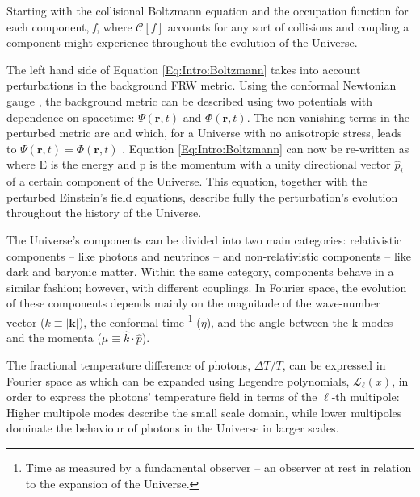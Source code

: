 \qquad Starting with the collisional Boltzmann equation and the occupation function for each component, \textit{f}, 
where $\mathcal{C}[f]$ accounts for any sort of collisions and coupling a component might experience throughout the evolution of the Universe.

\qquad The left hand side of Equation \eqref{Eq:Intro:Boltzmann} takes into account perturbations in the background FRW metric. Using the conformal Newtonian gauge \citep{dods}, the background metric can be described using two potentials with dependence on spacetime: $\Psi (\textbf{r}, t)$ and $\Phi (\textbf{r}, t)$. The non-vanishing terms in the perturbed metric are
and 
which, for a Universe with no anisotropic stress, leads to $\Psi (\textbf{r},t) = \Phi(\textbf{r},t)$ \citep{Peacock}. Equation \eqref{Eq:Intro:Boltzmann} can now be re-written as
where E is the energy and p is the momentum with a unity directional vector $\hat{p}_i$ of a certain component of the Universe. This equation, together with the perturbed Einstein's field equations, describe fully the perturbation's evolution throughout the history of the Universe.

\qquad The Universe's components can be divided into two main categories: relativistic components -- like photons and neutrinos -- and non-relativistic components -- like dark and baryonic matter. Within the same category, components behave in a similar fashion; however, with different couplings. In Fourier space, the evolution of these components depends mainly on the magnitude of the wave-number vector ($k \equiv |\textbf{k}|$), the conformal time \footnote{Time as measured by a fundamental observer -- an observer at rest in relation to the expansion of the Universe.} ($\eta$), and the angle between the k-modes and the momenta ($\mu\equiv \hat{k} \cdot \hat{p}$). 

\qquad The fractional temperature difference of photons, $\Delta T/T$, can be expressed in Fourier space as
which can be expanded using Legendre polynomials, $\mathcal{L}_{\ell}(x)$, in order to express the photons' temperature field in terms of the $\ell$-th multipole:
Higher multipole modes describe the small scale domain, while lower multipoles dominate the behaviour of photons in the Universe in larger scales. 

